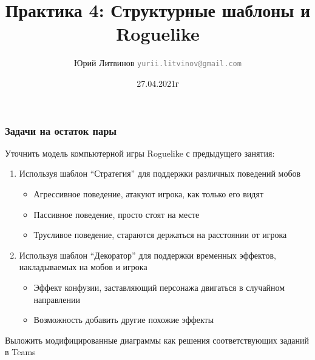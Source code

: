\documentclass[xetex,mathserif,serif]{beamer}
\title{Практика 4: Структурные шаблоны и Roguelike}
\author[Юрий Литвинов]{Юрий Литвинов \newline \textcolor{gray}{\small\texttt{yurii.litvinov@gmail.com}}}
\date{27.04.2021г}
\begin{document}
    
    \frame{\titlepage}

    \begin{frame}
        \frametitle{Задачи на остаток пары}
        Уточнить модель компьютерной игры Roguelike с предыдущего занятия:

        \begin{enumerate}
            \item Используя шаблон ``Стратегия'' для поддержки различных поведений мобов
            \begin{itemize}
                \item Агрессивное поведение, атакуют игрока, как только его видят
                \item Пассивное поведение, просто стоят на месте
                \item Трусливое поведение, стараются держаться на расстоянии от игрока
            \end{itemize}
            \item Используя шаблон ``Декоратор'' для поддержки временных эффектов, накладываемых на мобов и игрока
            \begin{itemize}
                \item Эффект конфузии, заставляющий персонажа двигаться в случайном направлении
                \item Возможность добавить другие похожие эффекты
            \end{itemize}
        \end{enumerate}

        Выложить модифицированные диаграммы как решения соответствующих заданий в Teams
    \end{frame}
\end{document}
